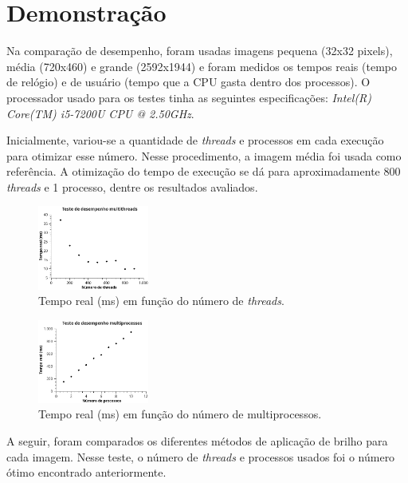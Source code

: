 \documentclass[a4paper, 10pt, conference]{ieeeconf}
\begin{document}
\section{Demonstração}


Na comparação de desempenho, foram usadas imagens pequena (32x32 pixels), média (720x460) e grande (2592x1944) e foram medidos os tempos reais (tempo de relógio) e de usuário (tempo que a CPU gasta dentro dos processos). O processador usado para os testes tinha as seguintes especificações: \textit{Intel(R) Core(TM) i5-7200U CPU @ 2.50GHz}.

Inicialmente, variou-se a quantidade de \textit{threads} e processos em cada execução para otimizar esse número. Nesse procedimento, a imagem média foi usada como referência. A otimização do tempo de execução se dá para aproximadamente 800 \textit{threads} e 1 processo, dentre os resultados avaliados.

\begin{figure}[h]
	\centering
	\includegraphics[width=3.65cm]{Figuras/multithreads}
	\caption{Tempo real (ms) em função do número de \textit{threads}.}
\end{figure}

\begin{figure}[h]
	\centering
	\includegraphics[width=3.65cm]{Figuras/multiprocessos}
	\caption{Tempo real (ms) em função do número de multiprocessos.}
\end{figure}

A seguir, foram comparados os diferentes métodos de aplicação de brilho para cada imagem. Nesse teste, o número de \textit{threads} e processos usados foi o número ótimo encontrado anteriormente.
\end{document}
